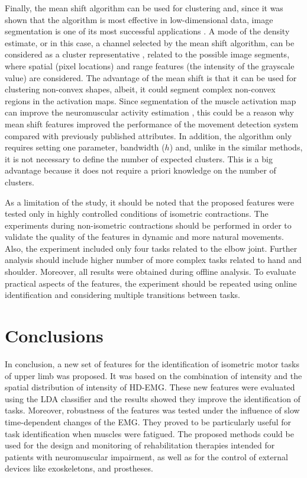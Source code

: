 Finally, the mean shift algorithm can be used for clustering and, since it was shown that the algorithm is most effective in low-dimensional data, image segmentation is one of its most successful applications \citep{Comaniciu2002}. A mode of the density estimate, or in this case, a channel selected by the mean shift algorithm, can be considered as a cluster representative \citep{Hennig2015}, related to the possible image segments, where spatial (pixel locations) and range features (the intensity of the grayscale value) are considered. The advantage of the mean shift is that it can be used for clustering non-convex shapes, albeit, it could segment complex non-convex regions in the activation maps. Since segmentation of the muscle activation map can improve the neuromuscular activity estimation \citep{Vieira2010}, this could be a reason why mean shift features improved the performance of the movement detection system compared with previously published attributes. In addition, the algorithm only requires setting one parameter, bandwidth ($h$) and, unlike in the similar methods, it is not necessary to define the number of expected clusters. This is a big advantage because it does not require a priori knowledge on the number of clusters.

As a limitation of the study, it should be noted that the proposed features were tested only in highly controlled conditions of isometric contractions. The experiments during non-isometric contractions should be performed in order to validate the quality of the features in dynamic and more natural movements. Also, the experiment included only four tasks related to the elbow joint. Further analysis should include higher number of more complex tasks related to hand and shoulder. Moreover, all results were obtained during offline analysis. To evaluate practical aspects of the features, the experiment should be repeated using online identification and considering multiple transitions between tasks.


\section{Conclusions}
In conclusion, a new set of features for the identification of isometric motor tasks of upper limb was proposed. It was based on the combination of intensity and the spatial distribution of intensity of HD-EMG. These new features were evaluated using the LDA classifier and the results showed they improve the identification of tasks. Moreover, robustness of the features was tested under the influence of slow time-dependent changes of the EMG. They proved to be particularly useful for task identification when muscles were fatigued. The proposed methods could be used for the design and monitoring of rehabilitation therapies intended for patients with neuromuscular impairment, as well as for the control of external devices like exoskeletons, and prostheses.


